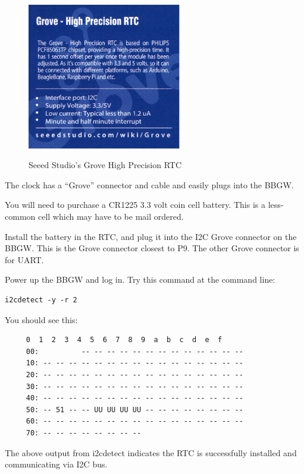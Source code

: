\begin{figure}[H]
	\centering
	\includegraphics[width=0.6\textwidth]{photos/grove-rtc}
	\centering\bfseries
	\caption{Seeed Studio's Grove High Precision RTC}
\end{figure}

The clock has a ``Grove'' connector and cable and easily plugs into the BBGW.

You will need to purchase a CR1225 3.3 volt coin cell battery.  This is a less-common cell which may have to be mail ordered.

Install the battery in the RTC, and plug it into the I2C Grove connector on the BBGW.  This is the Grove connector closest to P9.  The other Grove connector is for UART.

Power up the BBGW and log in.  Try this command at the command line:

\begin{verbatim}
i2cdetect -y -r 2
\end{verbatim}

You should see this:

\begin{verbatim}
     0  1  2  3  4  5  6  7  8  9  a  b  c  d  e  f
     00:          -- -- -- -- -- -- -- -- -- -- -- -- -- 
     10: -- -- -- -- -- -- -- -- -- -- -- -- -- -- -- -- 
     20: -- -- -- -- -- -- -- -- -- -- -- -- -- -- -- -- 
     30: -- -- -- -- -- -- -- -- -- -- -- -- -- -- -- -- 
     40: -- -- -- -- -- -- -- -- -- -- -- -- -- -- -- -- 
     50: -- 51 -- -- UU UU UU UU -- -- -- -- -- -- -- -- 
     60: -- -- -- -- -- -- -- -- -- -- -- -- -- -- -- -- 
     70: -- -- -- -- -- -- -- --
\end{verbatim}

The above output from i2cdetect indicates the RTC is successfully installed and communicating via I2C bus.


